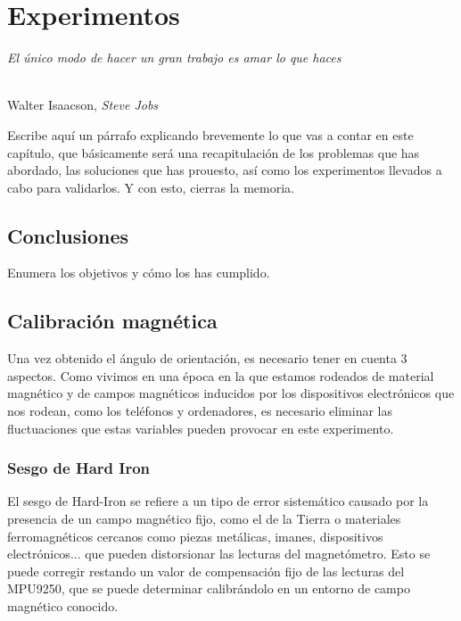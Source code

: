 \chapter{Experimentos}
\label{cap:capitulo6}

\begin{flushright}
\begin{minipage}[]{10cm}
\emph{El único modo de hacer un gran trabajo es amar lo que haces}\\
\end{minipage}\\

Walter Isaacson, \textit{Steve Jobs}\\
\end{flushright}

\vspace{1cm}

Escribe aquí un párrafo explicando brevemente lo que vas a contar en este capítulo, que básicamente será una recapitulación de los problemas que has abordado, las soluciones que has prouesto, así como los experimentos llevados a cabo para validarlos. Y con esto, cierras la memoria.

\section{Conclusiones}

Enumera los objetivos y cómo los has cumplido.\\



\section{Calibración magnética}
\label{sec:cal_mag}

Una vez obtenido el ángulo de orientación,  es necesario tener en cuenta 3 aspectos. Como vivimos en una época en la que estamos rodeados de material magnético y de campos magnéticos inducidos por los dispositivos electrónicos que nos rodean, como los teléfonos y ordenadores, es necesario eliminar las fluctuaciones que estas variables pueden provocar en este experimento.\\

\subsection{Sesgo de Hard Iron}
\label{subsec:hard_iron}

El sesgo de Hard-Iron se refiere a un tipo de error sistemático causado por la presencia de un campo magnético fijo, como el de la Tierra o materiales ferromagnéticos cercanos como piezas metálicas, imanes, dispositivos electrónicos... que pueden distorsionar las lecturas del magnetómetro. Esto se puede corregir restando un valor de compensación fijo de las lecturas del MPU9250, que se puede determinar calibrándolo en un entorno de campo magnético conocido.

